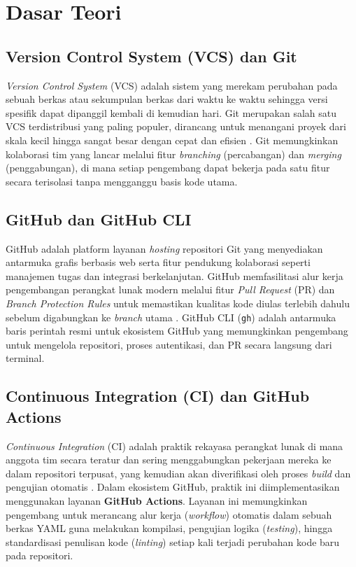 \chapter{Dasar Teori}

\section{Version Control System (VCS) dan Git}
\textit{Version Control System} (VCS) adalah sistem yang merekam perubahan pada sebuah berkas atau sekumpulan berkas dari waktu ke waktu sehingga versi spesifik dapat dipanggil kembali di kemudian hari. Git merupakan salah satu VCS terdistribusi yang paling populer, dirancang untuk menangani proyek dari skala kecil hingga sangat besar dengan cepat dan efisien \cite{gitDoc}. Git memungkinkan kolaborasi tim yang lancar melalui fitur \textit{branching} (percabangan) dan \textit{merging} (penggabungan), di mana setiap pengembang dapat bekerja pada satu fitur secara terisolasi tanpa mengganggu basis kode utama.

\section{GitHub dan GitHub CLI}
GitHub adalah platform layanan \textit{hosting} repositori Git yang menyediakan antarmuka grafis berbasis web serta fitur pendukung kolaborasi seperti manajemen tugas dan integrasi berkelanjutan. GitHub memfasilitasi alur kerja pengembangan perangkat lunak modern melalui fitur \textit{Pull Request} (PR) dan \textit{Branch Protection Rules} untuk memastikan kualitas kode diulas terlebih dahulu sebelum digabungkan ke \textit{branch} utama \cite{githubDoc}. GitHub CLI (\texttt{gh}) adalah antarmuka baris perintah resmi untuk ekosistem GitHub yang memungkinkan pengembang untuk mengelola repositori, proses autentikasi, dan PR secara langsung dari terminal.

\section{Continuous Integration (CI) dan GitHub Actions}
\textit{Continuous Integration} (CI) adalah praktik rekayasa perangkat lunak di mana anggota tim secara teratur dan sering menggabungkan pekerjaan mereka ke dalam repositori terpusat, yang kemudian akan diverifikasi oleh proses \textit{build} dan pengujian otomatis \cite{cicdConcept}. Dalam ekosistem GitHub, praktik ini diimplementasikan menggunakan layanan \textbf{GitHub Actions}. Layanan ini memungkinkan pengembang untuk merancang alur kerja (\textit{workflow}) otomatis dalam sebuah berkas YAML guna melakukan kompilasi, pengujian logika (\textit{testing}), hingga standardisasi penulisan kode (\textit{linting}) setiap kali terjadi perubahan kode baru pada repositori.

